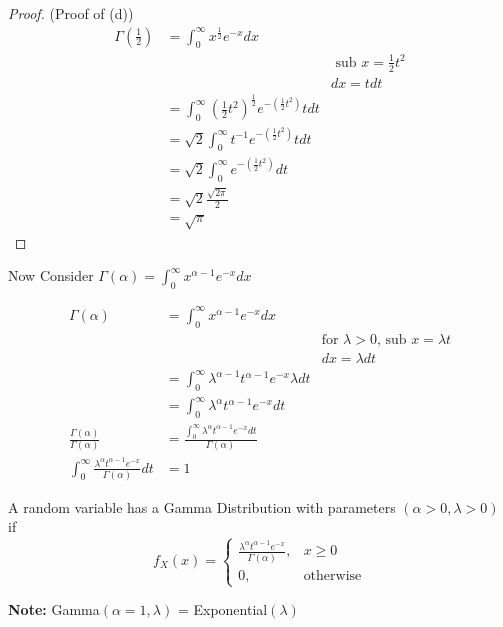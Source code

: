 \documentclass[12pt]{article}
\begin{document}
\begin{enumerate}
{	\begin{proof}
		(Proof of (d))\\
		\begin{align*}
			\Gamma (\frac{1}{2}) &= \int^\infty_0 x^{\frac{1}{2}} e^{-x} dx\\
			&& \text{ sub } x = \frac{1}{2}t^2\\
			&& dx = t dt\\
			&= \int^\infty_0 (\frac{1}{2}t^2)^{\frac{1}{2}} e^{-(\frac{1}{2}t^2)} t dt\\
			&= \sqrt{2} \int^\infty_0 t^{-1} e^{-(\frac{1}{2}t^2)} t dt\\
			&= \sqrt{2} \int^\infty_0 e^{-(\frac{1}{2}t^2)} dt\\
			&= \sqrt{2} \frac{\sqrt{2\pi}}{2}\\
			&= \sqrt{\pi}
		\end{align*}

	\end{proof}
	
	Now Consider $\Gamma (\alpha) = \int^\infty_0 x^{\alpha - 1} e^{-x} dx$

	\begin{align*}
		\Gamma (\alpha) &= \int^\infty_0 x^{\alpha - 1} e^{-x} dx\\
		&& \text{for $\lambda > 0$, sub } x = \lambda t\\
		&& dx = \lambda dt\\
		&= \int^\infty_0 \lambda^{\alpha - 1} t^{\alpha - 1} e^{-x} \lambda dt\\
		&= \int^\infty_0 \lambda^{\alpha} t^{\alpha - 1} e^{-x} dt\\
		\frac{\Gamma (\alpha)}{\Gamma (\alpha)} &= \frac{\int^\infty_0 \lambda^{\alpha} t^{\alpha - 1} e^{-x} dt}{\Gamma (\alpha)}\\
		\int^\infty_0 \frac{\lambda^{\alpha} t^{\alpha - 1} e^{-x}}{\Gamma (\alpha)} dt &= 1
	\end{align*}
	
	\begin{tcolorbox}[title=Definition: Gamma Distribution]
		A random variable has a Gamma Distribution with parameters $(\alpha > 0, \lambda > 0)$ if
		$$f_X (x) = 
		\begin{cases}
		\frac{\lambda^{\alpha} t^{\alpha - 1} e^{-x}}{\Gamma (\alpha)}, & x \geq 0\\
		0, & \text{otherwise}
		\end{cases}
$$
	\end{tcolorbox}

	\textbf{Note:} Gamma$(\alpha = 1, \lambda)$ = Exponential$(\lambda)$
	
}
\end{enumerate}
\end{document}
